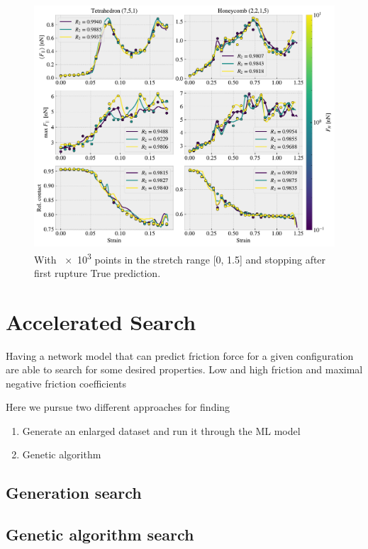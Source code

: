 \begin{figure}[H]
  \centering
  \includegraphics[width=\linewidth]{figures/ML/final_model_evaluation.pdf}
  \caption{With \num{e3} points in the stretch range [0, 1.5] and stopping after first rupture True prediction.}
  \label{fig:final_model_eval}
\end{figure}  


\section{Accelerated Search}

Having a network model that can predict friction force for a given configuration
are able to search for some desired properties. Low and high friction and
maximal negative friction coefficients


Here we pursue two different approaches for finding 
\begin{enumerate}
  \item Generate an enlarged dataset and run it through the ML model 
  \item Genetic algorithm
\end{enumerate}


\subsection{Generation search}

\subsection{Genetic algorithm search}



